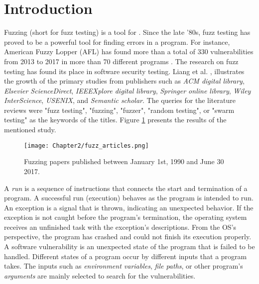 \section{Introduction} \label{sec:2.1}


Fuzzing (short for fuzz testing) is a tool for 
. Since the late '80s, fuzz testing has proved to be a powerful tool for finding errors in a program. For instance, American Fuzzy Lopper (AFL) has found more than a total of 330 vulnerabilities from 2013 to 2017 in more than 70 different programs \cite{afl_cve}. The research on fuzz testing has found its place in software security testing. Liang et al. \cite{liang2018fuzzing}, illustrates the growth of the primary studies from publishers such as \textit{ACM digital library}, \textit{Elsevier ScienceDirect}, \textit{IEEEXplore digital library}, \textit{Springer online library}, \textit{Wiley InterScience}, \textit{USENIX}, and \textit{Semantic scholar}. The queries for the literature reviews were "fuzz testing", "fuzzing", "fuzzer", "random testing", or "swarm testing" as the keywords of the titles. Figure \ref{fig:fuzz_articles} presents the results of the mentioned study.

\begin{figure}[!t]
    \texttt{[image: Chapter2/fuzz\_articles.png]}
    \centering
    \caption{Fuzzing papers published between January 1st, 1990 and June 30 2017. \cite{liang2018fuzzing}}
    \label{fig:fuzz_articles}
\end{figure}

A \textit{run} is a sequence of instructions that connects the start and termination of a program. A successful run (execution) behaves as the program is intended to run. An exception is a signal that is thrown, indicating an unexpected behavior. If the exception is not caught before the program's termination, the operating system receives an unfinished task with the exception's descriptions. From the OS's perspective, the program has crashed and could not finish its execution properly. A software vulnerability is an unexpected state of the program that is failed to be handled. Different states of a program occur by different inputs that a program takes. The inputs such as \textit{environment variables}, \textit{file paths}, or other program's \textit{arguments} are mainly selected to search for the vulnerabilities. 

